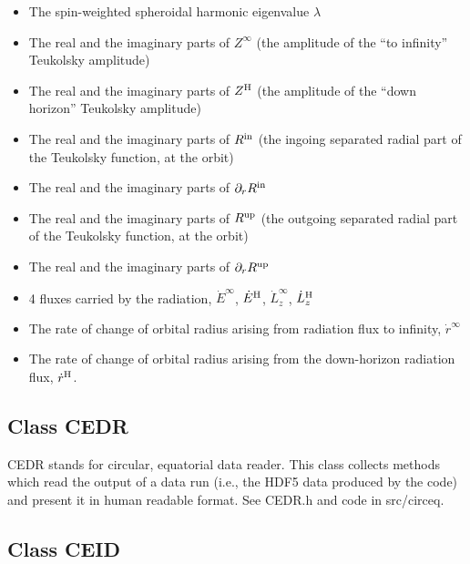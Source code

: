 \documentclass[11pt]{article}
\begin{document}
\begin{itemize}

\item The spin-weighted spheroidal harmonic eigenvalue $\lambda$

\item The real and the imaginary parts of $Z^\infty$ (the amplitude of the ``to infinity'' Teukolsky amplitude)

\item The real and the imaginary parts of $Z^{\rm H}$ (the amplitude of the ``down horizon'' Teukolsky amplitude)

\item The real and the imaginary parts of $R^{\rm in}$ (the ingoing separated radial part of the Teukolsky function, at the orbit)

\item The real and the imaginary parts of $\partial_r R^{\rm in}$

\item The real and the imaginary parts of $R^{\rm up}$ (the outgoing separated radial part of the Teukolsky function, at the orbit)

\item The real and the imaginary parts of $\partial_r R^{\rm up}$

\item 4 fluxes carried by the radiation, $\dot E^\infty$, $\dot E^{\rm H}$, $\dot L_z^\infty$, $\dot L_z^{\rm H}$

\item The rate of change of orbital radius arising from radiation flux to infinity, $\dot r^\infty$

\item The rate of change of orbital radius arising from the down-horizon radiation flux, $\dot r^{\rm H}$.

\end{itemize}

\subsection{Class CEDR}

CEDR stands for circular, equatorial data reader.  This class collects methods which read the output of a data run (i.e., the HDF5 data produced by the code) and present it in human readable format.  See CEDR.h and code in src/circeq.

\subsection{Class CEID}
\end{document}
